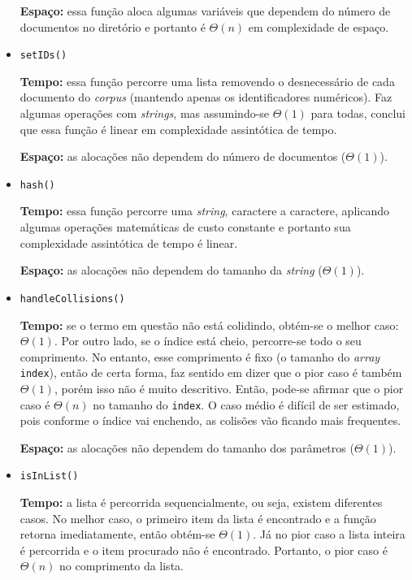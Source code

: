 \documentclass{article}
\def\code#1{\texttt{#1}}
\begin{document}
\begin{itemize}
	      \textbf{Espaço:} essa função aloca algumas variáveis que dependem do número de documentos no diretório e portanto é \( \Theta(n) \) em complexidade de espaço.

	\item \code{setIDs()}

	      \textbf{Tempo:} essa função percorre uma lista removendo o desnecessário de cada documento do \textit{corpus} (mantendo apenas os identificadores numéricos). Faz algumas operações com \textit{strings}, mas assumindo-se \( \Theta(1) \) para todas, conclui que essa função é linear em complexidade assintótica de tempo.

	      \textbf{Espaço:} as alocações não dependem do número de documentos (\( \Theta(1) \)).

	\item \code{hash()}

	      \textbf{Tempo:} essa função percorre uma \textit{string}, caractere a caractere, aplicando algumas operações matemáticas de custo constante e portanto sua complexidade assintótica de tempo é linear.

	      \textbf{Espaço:} as alocações não dependem do tamanho da \textit{string} (\( \Theta(1) \)).

	\item \code{handleCollisions()}

	      \textbf{Tempo:} se o termo em questão não está colidindo, obtém-se o melhor caso: \( \Theta(1) \). Por outro lado, se o índice está cheio, percorre-se todo o seu comprimento. No entanto, esse comprimento é fixo (o tamanho do \textit{array} \code{index}), então de certa forma, faz sentido em dizer que o pior caso é também \( \Theta(1) \), porém isso não é muito descritivo. Então, pode-se afirmar que o pior caso é \( \Theta(n) \) no tamanho do \code{index}. O caso médio é difícil de ser estimado, pois conforme o índice vai enchendo, as colisões vão ficando mais frequentes.

	      \textbf{Espaço:} as alocações não dependem do tamanho dos parâmetros (\( \Theta(1) \)).

	\item \code{isInList()}

	      \textbf{Tempo:} a lista é percorrida sequencialmente, ou seja, existem diferentes casos. No melhor caso, o primeiro item da lista é encontrado e a função retorna imediatamente, então obtém-se \( \Theta(1) \). Já no pior caso a lista inteira é percorrida e o item procurado não é encontrado. Portanto, o pior caso é \( \Theta(n) \) no comprimento da lista.


\end{itemize}
\end{document}
